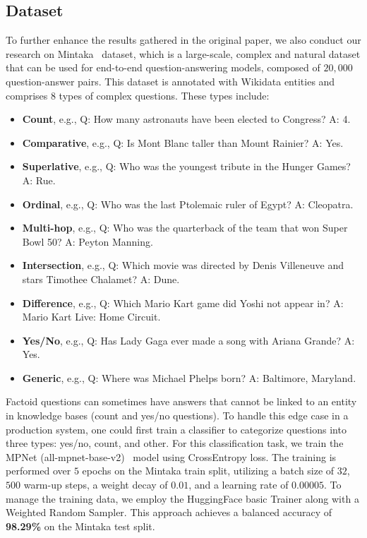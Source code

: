\subsection{Dataset} \label{sec:dataset}
To further enhance the results gathered in the original paper, we also conduct our research on Mintaka~\cite{DBLP:conf/coling/SenAS22-mintaka} dataset, which is a large-scale, complex and natural dataset that can be used for end-to-end question-answering models, composed of $20,000$ question-answer pairs. This dataset is annotated with Wikidata entities and comprises 8 types of complex questions. These types include: 
\begin{itemize}%
    \item \textbf{Count}, e.g., Q: How many astronauts have been elected to Congress? A: 4.
    \item \textbf{Comparative}, e.g., Q: Is Mont Blanc taller than Mount Rainier? A: Yes.
    \item \textbf{Superlative}, e.g., Q: Who was the youngest tribute in the Hunger Games? A: Rue.
    \item \textbf{Ordinal}, e.g., Q: Who was the last Ptolemaic ruler of Egypt? A: Cleopatra.
    \item \textbf{Multi-hop}, e.g., Q: Who was the quarterback of the team that won Super Bowl 50? A: Peyton Manning.
    \item \textbf{Intersection}, e.g., Q: Which movie was directed by Denis Villeneuve and stars Timothee Chalamet? A: Dune.
    \item \textbf{Difference}, e.g., Q: Which Mario Kart game did Yoshi not appear in? A: Mario Kart Live: Home Circuit.
    \item \textbf{Yes/No}, e.g., Q: Has Lady Gaga ever made a song with Ariana Grande? A: Yes.
    \item \textbf{Generic}, e.g., Q: Where was Michael Phelps born? A: Baltimore, Maryland.
\end{itemize}

Factoid questions can sometimes have answers that cannot be linked to an entity in knowledge bases (count and yes/no questions). To handle this edge case in a production system, one could first train a classifier to categorize questions into three types: yes/no, count, and other. For this classification task, we train the MPNet (all-mpnet-base-v2)~\cite{DBLP:conf/nips/Song0QLL20} model using CrossEntropy loss. The training is performed over $5$ epochs on the Mintaka train split, utilizing a batch size of $32$, $500$ warm-up steps, a weight decay of $0.01$, and a learning rate of $0.00005$. To manage the training data, we employ the HuggingFace basic Trainer along with a Weighted Random Sampler. This approach achieves a balanced accuracy of \textbf{98.29\%} on the Mintaka test split.

